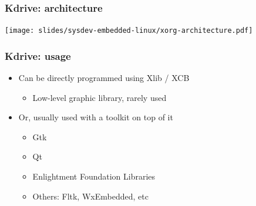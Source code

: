 \begin{frame}
  \frametitle{Kdrive: architecture}
  \begin{center}
    \texttt{[image: slides/sysdev-embedded-linux/xorg-architecture.pdf]}
  \end{center}
\end{frame}

\begin{frame}
  \frametitle{Kdrive: usage}
  \begin{itemize}
  \item Can be directly programmed using Xlib / XCB
    \begin{itemize}
    \item Low-level graphic library, rarely used
    \end{itemize}
  \item Or, usually used with a toolkit on top of it
    \begin{itemize}
    \item Gtk
    \item Qt
    \item Enlightment Foundation Libraries
    \item Others: Fltk, WxEmbedded, etc
    \end{itemize}
  \end{itemize}
\end{frame}

